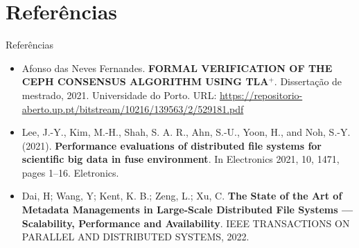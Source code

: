 \documentclass[xcolor=dvipsnames,table]{beamer}
\begin{document}
\section{Referências}
\begin{frame}{Referências}
    \begin{itemize}
    	\item Afonso das Neves Fernandes. \textbf{FORMAL VERIFICATION OF THE CEPH CONSENSUS ALGORITHM USING TLA$^{+}$}. Dissertação de mestrado, 2021. Universidade do Porto. URL: \url{https://repositorio-aberto.up.pt/bitstream/10216/139563/2/529181.pdf}
    	\item Lee, J.-Y., Kim, M.-H., Shah, S. A. R., Ahn, S.-U., Yoon, H., and Noh, S.-Y. (2021). \textbf{Performance evaluations of distributed file systems for scientific big data in fuse environment}. In Electronics 2021, 10, 1471, pages 1–16. Eletronics.
    	\item Dai, H; Wang, Y; Kent, K. B.; Zeng, L.; Xu, C. \textbf{The State of the Art of Metadata Managements in Large-Scale Distributed File Systems — Scalability, Performance and Availability}. IEEE TRANSACTIONS ON PARALLEL AND DISTRIBUTED SYSTEMS, 2022.
    \end{itemize}
\end{frame}

\begin{frame}[plain]{}
    \maketitle
\end{frame}

	
\end{document}

